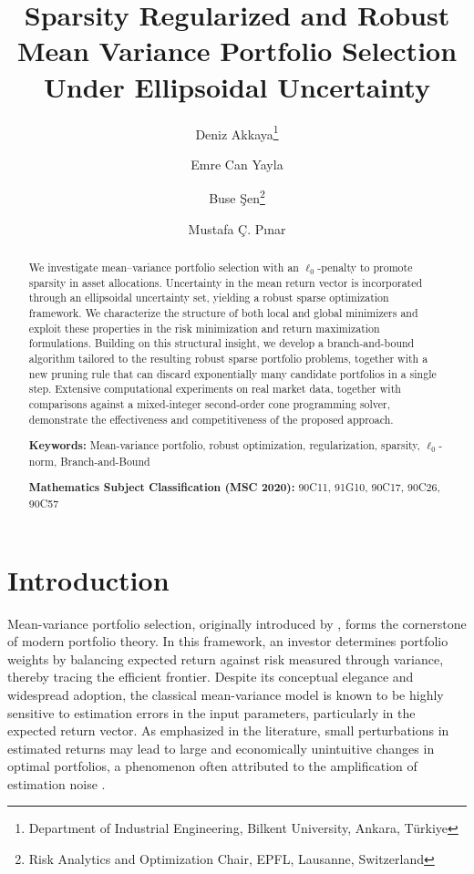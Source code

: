 \documentclass[11pt]{article}
\title{Sparsity Regularized and Robust Mean Variance Portfolio Selection Under Ellipsoidal Uncertainty}
\author{Deniz Akkaya\thanks{Department of Industrial Engineering, Bilkent University, Ankara, Türkiye}
\and Emre Can Yayla\footnotemark[1]
\and Buse \c{S}en\thanks{Risk Analytics and Optimization Chair, EPFL, Lausanne, Switzerland}
\and Mustafa Ç. Pınar\footnotemark[1]}
\date{}
\theoremstyle{plain}
\theoremstyle{definition}
\theoremstyle{plain}
\begin{document}
\maketitle

\begin{abstract}
We investigate mean–variance portfolio selection with an $\ell_0$-penalty to promote sparsity in asset allocations. Uncertainty in the mean return vector is incorporated through an ellipsoidal uncertainty set, yielding a robust sparse optimization framework. We characterize the structure of both local and global minimizers and exploit these properties in the risk minimization and return maximization formulations. Building on this structural insight, we develop a branch-and-bound algorithm tailored to the resulting robust sparse portfolio problems, together with a new pruning rule that can discard exponentially many candidate portfolios in a single step. Extensive computational experiments on real market data, together with comparisons against a mixed-integer second-order cone programming solver, demonstrate the effectiveness and competitiveness of the proposed approach.

\medskip
\noindent\textbf{Keywords:} Mean-variance portfolio, robust optimization, regularization, sparsity, $\ell_0$-norm, Branch-and-Bound

\medskip
\noindent\textbf{Mathematics Subject Classification (MSC 2020):} 90C11, 91G10, 90C17, 90C26, 90C57
\end{abstract}

\section{Introduction}\label{sec:Intro}
Mean-variance portfolio selection, originally introduced by \cite{Markowitz1952}, forms the cornerstone of modern portfolio theory. In this framework, an investor determines portfolio weights by balancing expected return against risk measured through variance, thereby tracing the efficient frontier. Despite its conceptual elegance and widespread adoption, the classical mean-variance model is known to be highly sensitive to estimation errors in the input parameters, particularly in the expected return vector. As emphasized in the literature, small perturbations in estimated returns may lead to large and economically unintuitive changes in optimal portfolios, a phenomenon often attributed to the amplification of estimation noise \cite{Michaud1989}.
\end{document}
